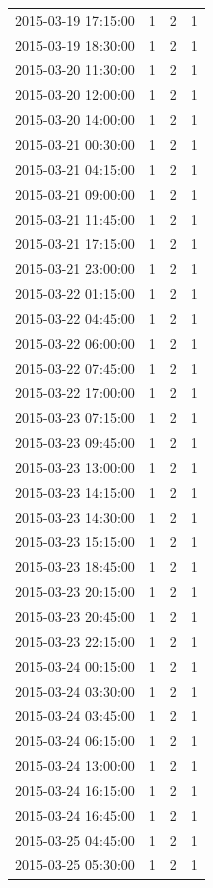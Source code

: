 \begin{tabular}{lrrr}
2015-03-19 17:15:00 & 1 & 2 & 1 \\
2015-03-19 18:30:00 & 1 & 2 & 1 \\
2015-03-20 11:30:00 & 1 & 2 & 1 \\
2015-03-20 12:00:00 & 1 & 2 & 1 \\
2015-03-20 14:00:00 & 1 & 2 & 1 \\
2015-03-21 00:30:00 & 1 & 2 & 1 \\
2015-03-21 04:15:00 & 1 & 2 & 1 \\
2015-03-21 09:00:00 & 1 & 2 & 1 \\
2015-03-21 11:45:00 & 1 & 2 & 1 \\
2015-03-21 17:15:00 & 1 & 2 & 1 \\
2015-03-21 23:00:00 & 1 & 2 & 1 \\
2015-03-22 01:15:00 & 1 & 2 & 1 \\
2015-03-22 04:45:00 & 1 & 2 & 1 \\
2015-03-22 06:00:00 & 1 & 2 & 1 \\
2015-03-22 07:45:00 & 1 & 2 & 1 \\
2015-03-22 17:00:00 & 1 & 2 & 1 \\
2015-03-23 07:15:00 & 1 & 2 & 1 \\
2015-03-23 09:45:00 & 1 & 2 & 1 \\
2015-03-23 13:00:00 & 1 & 2 & 1 \\
2015-03-23 14:15:00 & 1 & 2 & 1 \\
2015-03-23 14:30:00 & 1 & 2 & 1 \\
2015-03-23 15:15:00 & 1 & 2 & 1 \\
2015-03-23 18:45:00 & 1 & 2 & 1 \\
2015-03-23 20:15:00 & 1 & 2 & 1 \\
2015-03-23 20:45:00 & 1 & 2 & 1 \\
2015-03-23 22:15:00 & 1 & 2 & 1 \\
2015-03-24 00:15:00 & 1 & 2 & 1 \\
2015-03-24 03:30:00 & 1 & 2 & 1 \\
2015-03-24 03:45:00 & 1 & 2 & 1 \\
2015-03-24 06:15:00 & 1 & 2 & 1 \\
2015-03-24 13:00:00 & 1 & 2 & 1 \\
2015-03-24 16:15:00 & 1 & 2 & 1 \\
2015-03-24 16:45:00 & 1 & 2 & 1 \\
2015-03-25 04:45:00 & 1 & 2 & 1 \\
2015-03-25 05:30:00 & 1 & 2 & 1 \\

\end{tabular}
